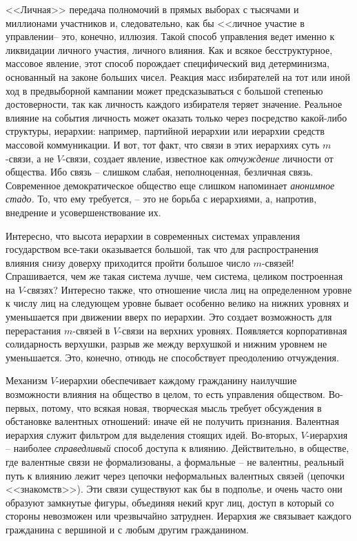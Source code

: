 \documentclass{book}
\begin{document}
<<Личная>> передача полномочий в прямых выборах с тысячами и миллионами участников и, следовательно, как бы <<личное уча­стие в управлении-- это, конечно, иллюзия. Такой способ управле­ния ведет именно к ликвидации личного участия, личного влия­ния. Как и всякое бесструктурное, массовое явление, этот спо­соб порождает специфический вид детерминизма, основанный на законе больших чисел. Реакция масс избирателей на тот или иной ход в предвыборной кампании может предсказываться с большой степенью достоверности, так как личность каждо­го избирателя теряет значение. Реальное влияние на события личность может оказать только через посредство какой-либо структуры, иерархии: например, партийной иерархии или иерар­хии средств массовой коммуникации. И вот, тот факт, что связи в этих иерархиях суть $m$-связи, а не $V$-связи, создает явление, известное как \textit{отчуждение}  личности от общества. Ибо связь -- слишком слабая, неполноценная, безличная связь. Современное демократическое общество еще слишком напоминает \textit{аноним­ное стадо.}  То, что ему требуется, -- это не борьба с иерархиями, а, напротив, внедрение и усовершенствование их.

Интересно, что высота иерархии в современных системах уп­равления государством все-таки оказывается большой, так что для распространения влияния снизу доверху приходится пройти большое число $m$-связей! Спрашивается, чем же такая система лучше, чем система, целиком построенная на $V$-связях? Инте­ресно также, что отношение числа лиц на определенном уровне к числу лиц на следующем уровне бывает особенно велико на нижних уровнях и уменьшается при движении вверх по иерар­хии. Это создает возможность для перерастания $m$-связей в $V$-связи на верхних уровнях. Появляется корпоративная соли­дарность верхушки, разрыв же между верхушкой и нижним уровнем не уменьшается. Это, конечно, отнюдь не способствует преодолению отчуждения.

Механизм $V$-иерархии обеспечивает каждому гражданину наилучшие возможности влияния на общество в целом, то есть управления обществом. Во-первых, потому, что всякая новая, творческая мысль требует обсуждения в обстановке валентных отношений: иначе ей не получить признания. Валентная иерархия служит фильтром для выделения стоящих идей. Во-вторых, $V$-иерархия -- наиболее \textit{справедливый}  способ до­ступа к влиянию. Действительно, в обществе, где валентные связи не формализованы, а формальные -- не валентны, реальный путь к влиянию лежит через цепочки неформальных валентных связей (цепочки <<знакомств>>). Эти связи существуют как бы в подполье, и очень часто они образуют замкнутые фигуры, объе­диняя некий круг лиц, доступ в который со стороны невозможен или чрезвычайно затруднен. Иерархия же связывает каждого гражданина с вершиной и с любым другим гражданином.
\end{document}
